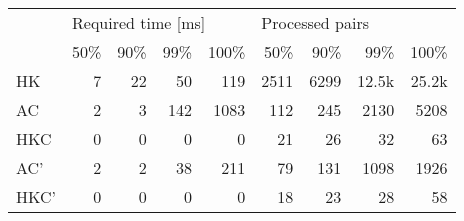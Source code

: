 \begin{tabular}{l|rrrr|rrrr}
\multirow{2}{*}{} & \multicolumn{4}{l|}{Required time {[}ms{]}} & \multicolumn{4}{l}{Processed pairs} \\ \cline{2-9}
                  & 50\% & 90\% & 99\% & 100\%                 & 50\%   & 90\%   & 99\%    & 100\%   \\ \hline
HK                & 7    & 22   & 50   & 119                   & 2511   & 6299   & 12.5k   & 25.2k   \\
AC                & 2    & 3    & 142  & 1083                  & 112    & 245    & 2130    & 5208    \\
HKC               & 0    & 0    & 0    & 0                     & 21     & 26     & 32      & 63      \\
AC'               & 2    & 2    & 38   & 211                   & 79     & 131    & 1098    & 1926    \\
HKC'              & 0    & 0    & 0    & 0                     & 18     & 23     & 28      & 58
\end{tabular}
